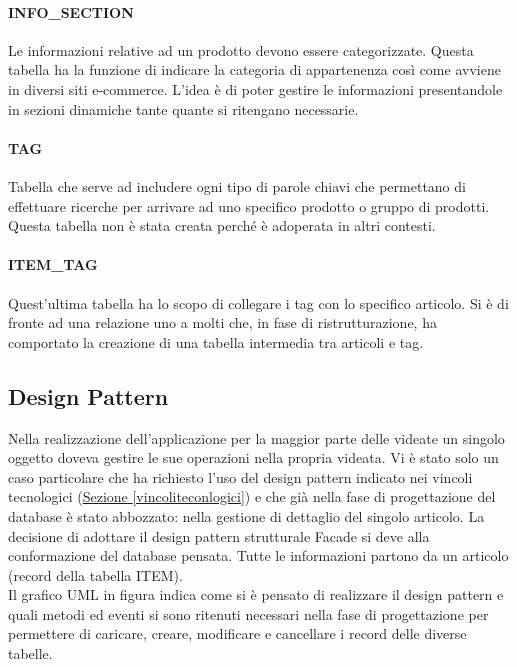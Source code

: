 \paragraph{INFO\_SECTION}
Le informazioni relative ad un prodotto devono essere categorizzate. Questa tabella ha la funzione di indicare la categoria di appartenenza così come avviene in diversi siti e-commerce. L'idea è di poter gestire le informazioni presentandole in sezioni dinamiche tante quante si ritengano necessarie. 

\paragraph{TAG}
Tabella che serve ad includere ogni tipo di parole chiavi che permettano di effettuare ricerche per arrivare ad uno specifico prodotto o gruppo di prodotti. Questa tabella non è stata creata perché è adoperata in altri contesti.

\paragraph{ITEM\_TAG}
Quest'ultima tabella ha lo scopo di collegare i tag con lo specifico articolo. Si è di fronte ad una relazione uno a molti che, in fase di ristrutturazione, ha comportato la creazione di una tabella intermedia tra articoli e tag.



\subsection{Design Pattern}
Nella realizzazione dell'applicazione per la maggior parte delle videate un singolo oggetto doveva gestire le sue operazioni nella propria videata. Vi è stato solo un caso particolare che ha richiesto l'uso del design pattern indicato nei vincoli tecnologici (\hyperref[vincoliteconlogici]{Sezione \ref{vincoliteconlogici}}) e che già nella fase di progettazione del database è stato abbozzato: nella gestione di dettaglio del singolo articolo.
La decisione di adottare il design pattern strutturale Facade si deve alla conformazione del database pensata. Tutte le informazioni partono da un articolo (record della tabella ITEM).\\

Il grafico UML in figura \todo indica come si è pensato di realizzare il design pattern e quali metodi ed eventi si sono ritenuti necessari nella fase di progettazione per permettere di caricare, creare, modificare e cancellare i record delle diverse tabelle.

